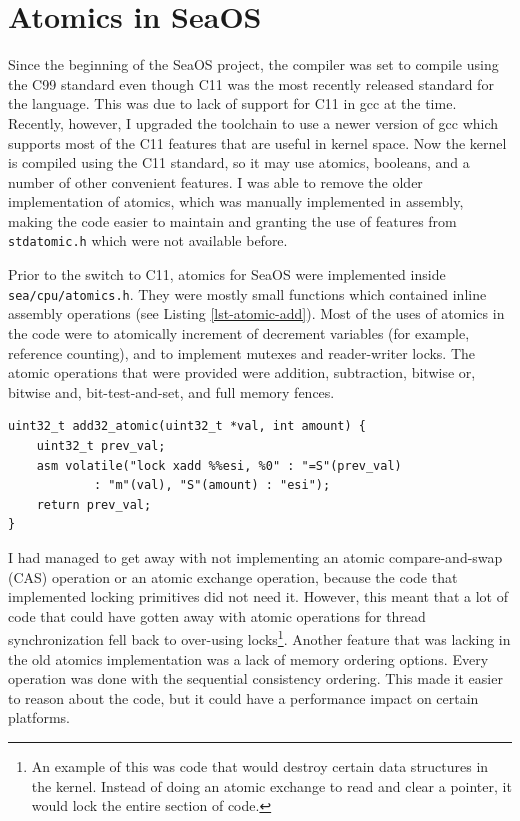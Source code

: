 \documentclass[12pt]{article}
\begin{document}
\section{Atomics in SeaOS}
Since the beginning of the SeaOS project, the compiler was set to compile using the C99 standard
even though C11 was the most recently released standard for the language. This was due to lack
of support for C11 in gcc at the time. Recently, however, I upgraded the toolchain to use a newer version
of gcc which supports most of the C11 features that are useful in kernel space. Now the kernel is compiled using the
C11 standard, so it may use atomics, booleans, and a number of other convenient features. I was able
to remove the older implementation of atomics, which was manually implemented in assembly,
making the code easier to maintain and granting the use of features from \texttt{stdatomic.h} which
were not available before.

Prior to the switch to C11, atomics for SeaOS were implemented inside \texttt{sea/cpu/atomics.h}.
They were mostly small functions which contained inline assembly operations (see Listing \ref{lst-atomic-add}).
Most of the uses of atomics in the code were to atomically increment of decrement variables (for
example, reference counting), and to implement mutexes and reader-writer locks. The atomic
operations that were provided were addition, subtraction, bitwise or, bitwise and, bit-test-and-set,
and full memory fences.
\begin{lstlisting}[label=lst-atomic-add, caption={[Manually implemented atomic addition.]Example atomic operation implementation (32-bit addition) without C11 atomics. Adds \texttt{amount} to the 32-bit integer pointed to by \texttt{val} and returns the old value. In C11 a similar function is already implemented.}]
uint32_t add32_atomic(uint32_t *val, int amount) {
	uint32_t prev_val;
	asm volatile("lock xadd %%esi, %0" : "=S"(prev_val)
			: "m"(val), "S"(amount) : "esi");
	return prev_val;
}
\end{lstlisting}

I had managed to get away with not implementing an atomic compare-and-swap (CAS) operation
or an atomic exchange operation, because
the code that implemented locking primitives did not need it. However, this
meant that a lot of code that could have gotten away with atomic operations for thread
synchronization fell back to over-using locks\footnote{An example of this was code
	that would destroy certain data structures in the kernel. Instead of doing an atomic
exchange to read and clear a pointer, it would lock the entire section of code.}.
Another feature that was lacking in the old atomics implementation was a lack of memory
ordering options. Every operation was done with the sequential consistency ordering.
This made it easier to reason about the code, but it could
have a performance impact on certain platforms.
\end{document}
